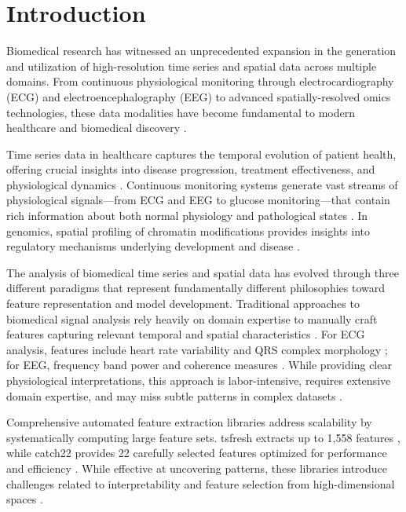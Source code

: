 \documentclass[11pt]{article}
\begin{document}
\section{Introduction}
Biomedical research has witnessed an unprecedented expansion in the
generation and utilization of high-resolution time series and spatial data
across multiple domains.
From continuous physiological monitoring through electrocardiography (ECG)
and electroencephalography (EEG) to advanced spatially-resolved omics
technologies, these data modalities have become fundamental to modern
healthcare and biomedical discovery \cite{morid2023time, rood2022impact}.

Time series data in healthcare captures the temporal evolution of patient
health, offering crucial insights into disease progression, treatment
effectiveness, and physiological dynamics \cite{patharkar2024predictive}.
Continuous monitoring systems generate vast streams of physiological
signals---from ECG and EEG to glucose monitoring---that contain rich information
about both normal physiology and pathological states
\cite{chaddad2023electroencephalography, anbalagan2023analysis}.
In genomics, spatial profiling of chromatin modifications provides insights into
regulatory mechanisms underlying development and disease \cite{yadav2022systems}.

The analysis of biomedical time series and spatial data has evolved through
three different paradigms that represent fundamentally different philosophies
toward feature representation and model development.
Traditional approaches to biomedical signal analysis rely heavily on domain
expertise to manually craft features capturing relevant temporal and spatial
characteristics \cite{fulcher2018feature}.
For ECG analysis, features include heart rate variability and QRS complex
morphology \cite{gelen2025novel, ansari2023deep}; for EEG, frequency band power
and coherence measures \cite{moutonnet2025augmentation}.
While providing clear physiological interpretations, this approach is
labor-intensive, requires extensive domain expertise, and may miss subtle
patterns in complex datasets \cite{miotto2018deep,ansari2023deep}.

Comprehensive automated feature extraction libraries address scalability by
systematically computing large feature sets.
tsfresh extracts up to 1,558 features \cite{christ2018tsfresh}, while catch22
provides 22 carefully selected features optimized for performance and efficiency
\cite{lubba2019catch22}.
While effective at uncovering patterns, these libraries introduce challenges
related to interpretability and feature selection from high-dimensional spaces
\cite{henderson2021empirical, petelin2023towards}.
\end{document}
